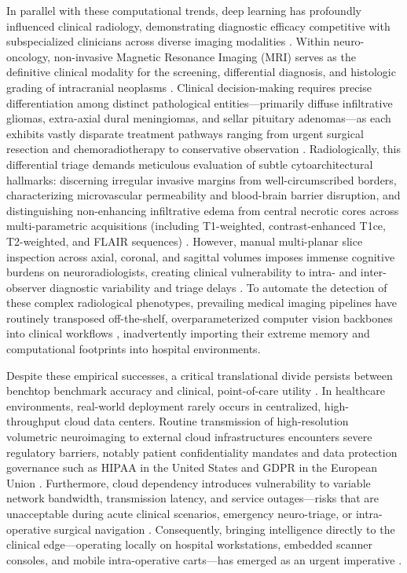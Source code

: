 In parallel with these computational trends, deep learning has profoundly influenced clinical radiology, demonstrating diagnostic efficacy competitive with subspecialized clinicians across diverse imaging modalities \cite{7, 28}. Within neuro-oncology, non-invasive Magnetic Resonance Imaging (MRI) serves as the definitive clinical modality for the screening, differential diagnosis, and histologic grading of intracranial neoplasms \cite{2, 26, 38}. Clinical decision-making requires precise differentiation among distinct pathological entities---primarily diffuse infiltrative gliomas, extra-axial dural meningiomas, and sellar pituitary adenomas---as each exhibits vastly disparate treatment pathways ranging from urgent surgical resection and chemoradiotherapy to conservative observation \cite{26, 40}. Radiologically, this differential triage demands meticulous evaluation of subtle cytoarchitectural hallmarks: discerning irregular invasive margins from well-circumscribed borders, characterizing microvascular permeability and blood-brain barrier disruption, and distinguishing non-enhancing infiltrative edema from central necrotic cores across multi-parametric acquisitions (including T1-weighted, contrast-enhanced T1ce, T2-weighted, and FLAIR sequences) \cite{2, 28, 38}. However, manual multi-planar slice inspection across axial, coronal, and sagittal volumes imposes immense cognitive burdens on neuroradiologists, creating clinical vulnerability to intra- and inter-observer diagnostic variability and triage delays \cite{7, 40}. To automate the detection of these complex radiological phenotypes, prevailing medical imaging pipelines have routinely transposed off-the-shelf, overparameterized computer vision backbones into clinical workflows \cite{7, 39, 40}, inadvertently importing their extreme memory and computational footprints into hospital environments.

Despite these empirical successes, a critical translational divide persists between benchtop benchmark accuracy and clinical, point-of-care utility \cite{21, 25}. In healthcare environments, real-world deployment rarely occurs in centralized, high-throughput cloud data centers. Routine transmission of high-resolution volumetric neuroimaging to external cloud infrastructures encounters severe regulatory barriers, notably patient confidentiality mandates and data protection governance such as HIPAA in the United States and GDPR in the European Union \cite{21}. Furthermore, cloud dependency introduces vulnerability to variable network bandwidth, transmission latency, and service outages---risks that are unacceptable during acute clinical scenarios, emergency neuro-triage, or intra-operative surgical navigation \cite{21, 25}. Consequently, bringing intelligence directly to the clinical edge---operating locally on hospital workstations, embedded scanner consoles, and mobile intra-operative carts---has emerged as an urgent imperative \cite{9, 20, 21}.

